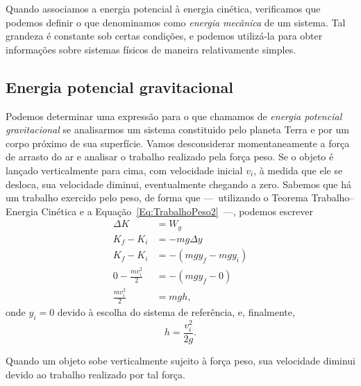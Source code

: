 
Quando associamos a energia potencial à energia cinética, verificamos que podemos definir o que denominamos como \emph{energia mecânica} de um sistema. Tal grandeza é constante sob certas condições, e podemos utilizá-la para obter informações sobre sistemas físicos de maneira relativamente simples.

\subsection{Energia potencial gravitacional}

Podemos determinar uma expressão para o que chamamos de \emph{energia potencial gravitacional} se analisarmos um sistema constituido pelo planeta Terra e por um corpo próximo de sua superfície. Vamos desconsiderar momentaneamente a força de arrasto do ar e analisar o trabalho realizado pela força peso. Se o objeto é lançado verticalmente para cima, com velocidade inicial $v_i$, à medida que ele se desloca, sua velocidade diminui, eventualmente chegando a zero. Sabemos que há um trabalho exercido pelo peso, de forma que ---~utilizando o Teorema Trabalho--Energia Cinética e a Equação~\ref{Eq:TrabalhoPeso2}~---, podemos escrever
\begin{align}
  \Delta K &= W_g \\
  K_f - K_i &=  -mg\Delta y \\
  K_f - K_i &=  -(mgy_f - mgy_i) \\
  0 - \frac{mv_i^2}{2} &= -(mgy_f - 0) \\
  \frac{mv_i^2}{2} &= mgh,
\end{align}
%
onde $y_i = 0$ devido à escolha do sistema de referência, e, finalmente,
\begin{equation}
    h = \frac{v_i^2}{2g}.
\end{equation}

\begin{marginfigure}[-2cm]
\centering
{}
\caption{Quando um objeto sobe verticalmente sujeito à força peso, sua velocidade diminui devido ao trabalho realizado por tal força.}
\end{marginfigure}

